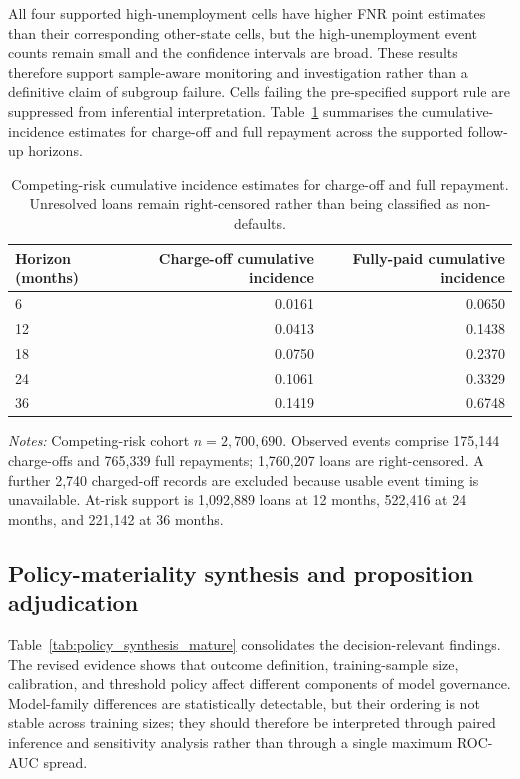 \documentclass[10pt]{article}
\begin{document}
All four supported high-unemployment cells have higher FNR point estimates than their corresponding other-state cells, but the high-unemployment event counts remain small and the confidence intervals are broad. These results therefore support sample-aware monitoring and investigation rather than a definitive claim of subgroup failure. Cells failing the pre-specified support rule are suppressed from inferential interpretation. Table~\ref{tab:competing_risk} summarises the cumulative-incidence estimates for charge-off and full repayment across the supported follow-up horizons.



\begin{table}[!ht]
\centering
\caption{Competing-risk cumulative incidence estimates for charge-off and full repayment. Unresolved loans remain right-censored rather than being classified as non-defaults.}
\label{tab:competing_risk}
\begin{tabular}{lrr}
\toprule
Horizon (months) & Charge-off cumulative incidence & Fully-paid cumulative incidence \\
\midrule
6  & 0.0161 & 0.0650 \\
12 & 0.0413 & 0.1438 \\
18 & 0.0750 & 0.2370 \\
24 & 0.1061 & 0.3329 \\
36 & 0.1419 & 0.6748 \\
\bottomrule
\end{tabular}

\vspace{3pt}
{\footnotesize \textit{Notes:} Competing-risk cohort $n=2{,}700{,}690$. Observed events comprise 175,144 charge-offs and 765,339 full repayments; 1,760,207 loans are right-censored. A further 2,740 charged-off records are excluded because usable event timing is unavailable. At-risk support is 1,092,889 loans at 12 months, 522,416 at 24 months, and 221,142 at 36 months.}
\end{table}



\subsection{Policy-materiality synthesis and proposition adjudication}
\label{sec:adjudication}

Table~\ref{tab:policy_synthesis_mature} consolidates the decision-relevant findings. The revised evidence shows that outcome definition, training-sample size, calibration, and threshold policy affect different components of model governance. Model-family differences are statistically detectable, but their ordering is not stable across training sizes; they should therefore be interpreted through paired inference and sensitivity analysis rather than through a single maximum ROC-AUC spread.
\end{document}
